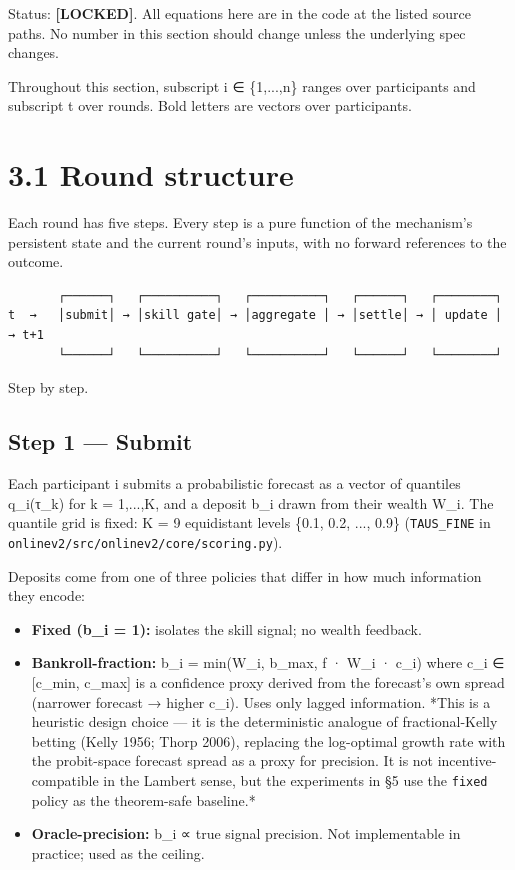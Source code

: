 \documentclass[11pt,a4paper,openany]{report}
\begin{document}
Status: \textbf{[LOCKED]}. All equations here are in the code at the listed
source paths. No number in this section should change unless the
underlying spec changes.

Throughout this section, subscript i ∈ \{1,...,n\} ranges over participants
and subscript t over rounds. Bold letters are vectors over participants.

\section{3.1 Round structure}

Each round has five steps. Every step is a pure function of the
mechanism's persistent state and the current round's inputs, with no
forward references to the outcome.

\begin{verbatim}
       ┌──────┐   ┌──────────┐   ┌──────────┐   ┌──────┐   ┌────────┐
t  →   │submit│ → │skill gate│ → │aggregate │ → │settle│ → │ update │   → t+1
       └──────┘   └──────────┘   └──────────┘   └──────┘   └────────┘
\end{verbatim}

Step by step.

\subsection{Step 1 — Submit}

Each participant i submits a probabilistic forecast as a vector of
quantiles q\_i(τ\_k) for k = 1,...,K, and a deposit b\_i drawn from their
wealth W\_i. The quantile grid is fixed: K = 9 equidistant levels
\{0.1, 0.2, ..., 0.9\} (\texttt{TAUS\_FINE} in
\texttt{onlinev2/src/onlinev2/core/scoring.py}).

Deposits come from one of three policies that differ in how much
information they encode:

\begin{itemize}
  \item \textbf{Fixed (b_i = 1):} isolates the skill signal; no wealth feedback.
  \item \textbf{Bankroll-fraction:} b\_i = min(W\_i, b\_max, f · W\_i · c\_i) where
    c\_i ∈ [c\_min, c\_max] is a confidence proxy derived from the
    forecast's own spread (narrower forecast → higher c\_i). Uses only
    lagged information. *This is a heuristic design choice — it is the
    deterministic analogue of fractional-Kelly betting (Kelly 1956;
    Thorp 2006), replacing the log-optimal growth rate with the
    probit-space forecast spread as a proxy for precision. It is not
    incentive-compatible in the Lambert sense, but the experiments in
    §5 use the \texttt{fixed} policy as the theorem-safe baseline.*
  \item \textbf{Oracle-precision:} b\_i ∝ true signal precision. Not implementable
    in practice; used as the ceiling.
\end{itemize}
\end{document}
